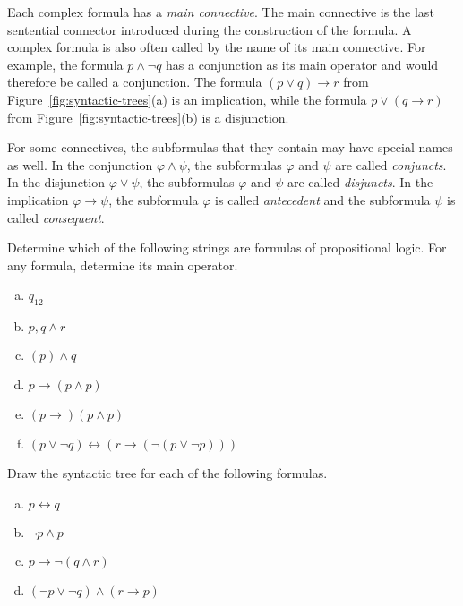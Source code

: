 \documentclass[nobib,nofonts]{tufte-handout}
\begin{document}
Each complex formula has a \emph{main connective}.
The main connective is the last sentential connector introduced during the construction of the formula.
A complex formula is also often called by the name of its main connective.
For example, the formula $p \wedge \neg q$ has a conjunction as its main operator and would therefore be called a conjunction.
The formula $(p \vee q) \rightarrow r$ from Figure~\ref{fig:syntactic-trees}(a) is an implication, while the formula $p \vee (q \rightarrow r)$ from Figure~\ref{fig:syntactic-trees}(b) is a disjunction.

For some connectives, the subformulas that they contain may have special names as well.
In the conjunction $\varphi \wedge \psi$, the subformulas $\varphi$ and $\psi$ are called \emph{conjuncts}.
In the disjunction $\varphi \vee \psi$, the subformulas $\varphi$ and $\psi$ are called \emph{disjuncts}.
In the implication $\varphi \rightarrow \psi$, the subformula $\varphi$ is called \emph{antecedent} and the subformula $\psi$ is called \emph{consequent}.

\bigskip
\noindent \colorbox{mygray}{\centering
  \begin{minipage}{1.0\textwidth}

    \begin{exercise}
      Determine which of the following strings are formulas of propositional logic. For any formula, determine its main operator.
      \begin{multicols}{2}
        \begin{enumerate}[a.]
          \item $q_{12}$
          \item $p, q \wedge r$
          \item $(p) \wedge q$
          \item $p \rightarrow (p \wedge p)$
          \item $(p \rightarrow) (p \wedge p)$
          \item $(p \vee \neg q) \leftrightarrow (r \rightarrow (\neg (p \vee \neg p)))$
        \end{enumerate}
      \end{multicols}
    \end{exercise}

    \begin{exercise}
      Draw the syntactic tree for each of the following formulas.
      \begin{multicols}{2}
        \begin{enumerate}[a.]
          \item $p \leftrightarrow q$
          \item $\neg p \wedge p$
          \item $p \rightarrow \neg (q \wedge r)$
          \item $(\neg p \vee \neg q) \wedge (r \rightarrow p )$
        \end{enumerate}
      \end{multicols}
    \end{exercise}
  \end{minipage}
}
\end{document}
